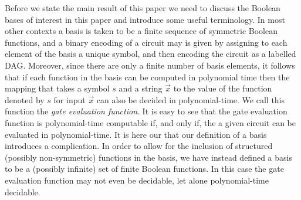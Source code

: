 \documentclass[../paper.tex]{subfiles}
\begin{document}




Before we state the main result of this paper we need to discuss the Boolean
bases of interest in this paper and introduce some useful terminology. In most
other contexts a basis is taken to be a finite sequence of symmetric Boolean
functions, and a binary encoding of a circuit may is given by assigning to each
element of the basis a unique symbol, and then encoding the circuit as a
labelled DAG. Moreover, since there are only a finite number of basis elements,
it follows that if each function in the basis can be computed in polynomial time
then the mapping that takes a symbol $s$ and a string $\vec{x}$ to the value of
the function denoted by $s$ for input $\vec{x}$ can also be decided in
polynomial-time. We call this function the \emph{gate evaluation function}. It
is easy to see that the gate evaluation function is polynomial-time computable
if, and only if, the a given circuit can be evaluated in polynomial-time. It is
here our that our definition of a basis introduces a complication. In order to
allow for the inclusion of structured (possibly non-symmetric) functions in the
basis, we have instead defined a basis to be a (possibly infinite) set of finite
Boolean functions. In this case the gate evaluation function may not even be
decidable, let alone polynomial-time decidable.
\end{document}
